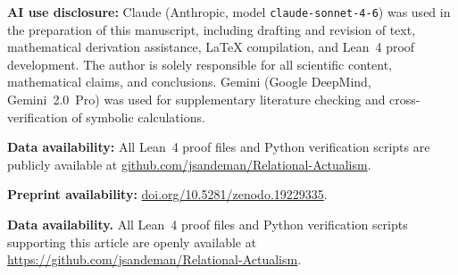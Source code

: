 \documentclass[11pt,a4paper]{article}
\begin{document}
\textbf{AI use disclosure:} Claude (Anthropic, model \texttt{claude-sonnet-4-6}) was used in the preparation of this manuscript, including drafting and revision of text, mathematical derivation assistance, \LaTeX{} compilation, and Lean~4 proof development. The author is solely responsible for all scientific content, mathematical claims, and conclusions. Gemini (Google DeepMind, Gemini~2.0~Pro) was used for supplementary literature checking and cross-verification of symbolic calculations.

\textbf{Data availability:} All Lean~4 proof files and Python verification scripts are publicly available at \href{https://github.com/jsandeman/Relational-Actualism}{github.com/jsandeman/Relational-Actualism}.

\textbf{Preprint availability:} \href{https://doi.org/10.5281/zenodo.19229335}{doi.org/10.5281/zenodo.19229335}.


\smallskip\noindent
\textbf{Data availability.}
All Lean~4 proof files and Python verification scripts supporting this
article are openly available at
\url{https://github.com/jsandeman/Relational-Actualism}.
\end{document}
